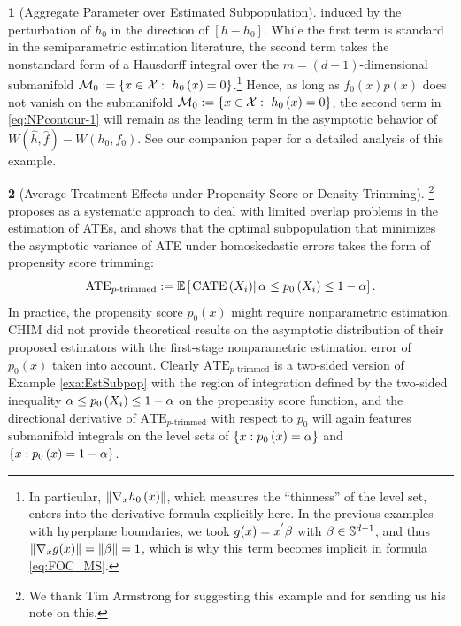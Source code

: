 \documentclass[12pt,american]{article}
\theoremstyle{definition}
\newtheorem{example}{\protect\examplename}
\theoremstyle{plain}
\theoremstyle{definition}
\theoremstyle{plain}
\theoremstyle{plain}
\theoremstyle{plain}
\theoremstyle{plain}
\theoremstyle{plain}
\newcommand{\E}{\mathbb{E}}
\newcommand{\norm}[1]{\left\| #1 \right\|}
\providecommand{\examplename}{Example}
\providecommand{\examplename}{Example}
\begin{document}
\begin{example}[Aggregate Parameter over Estimated Subpopulation]
  induced by the perturbation of $h_{0}$ in the direction of $[h-h_{0}]$.
  While the first term is standard in the semiparametric estimation literature,
  the second term takes the nonstandard form of a Hausdorff integral over
  the $m=\left(d-1\right)$-dimensional submanifold ${\cal M}_0:=\left\{x\in \mathcal{X}:~ h_{0}\left(x\right)=0\right\}$.\footnote{In particular, $\norm{\Dif_{x}h_{0}\left(x\right)}$, which measures
    the ``thinness'' of the level set, enters into the derivative formula
    explicitly here. In the previous examples with hyperplane boundaries,
    we took $g(x)=x^{'}\beta$ with $\beta\in\mathbb{S}^{d-1}$, and
    thus $\norm{\Dif_{x}g(x)}=\norm{\b}=1$, which is
  why this term becomes implicit in formula \eqref{eq:FOC_MS}.} Hence,
  as long as $f_0(x)p(x)$ does not vanish on the submanifold ${\cal M}_0:=\left\{x\in \mathcal{X}:~ h_{0}\left(x\right)=0\right\}$, the second term in \eqref{eq:NPcontour-1}
  will remain as the leading term in the asymptotic
  behavior of $W\left(\hat{h},\hat{f}\right)-W(h_0,f_0)$.
  See our companion paper \citep*{CCG2025} for a detailed analysis of this example.
\end{example}
%

%

\begin{example}[Average Treatment Effects under Propensity Score or Density Trimming]\label{exa:TrimATE}\footnote{We thank Tim Armstrong for suggesting this example and for sending us his note on this.}
  \citet*[CHIM thereafter]{crump2009dealing}
  proposes as a systematic approach to deal with limited overlap problems
  in the estimation of ATEs, and shows that the optimal subpopulation
  that minimizes the asymptotic variance of ATE under homoskedastic errors
  takes the form of propensity score trimming:
  \[
    \text{ATE}_{p\text{-trimmed}}:=\E\left[\rest{\text{CATE}\left(X_{i}\right)}\a\leq p_{0}\left(X_{i}\right)\leq1-\a\right].
  \]
  In practice, the propensity score $p_{0}\left(x\right)$ might require
  nonparametric estimation. CHIM did not provide theoretical results
  on the asymptotic distribution of their proposed estimators with the
  first-stage nonparametric estimation error of $p_{0}\left(x\right)$
  taken into account. Clearly $\text{ATE}_{p\text{-trimmed}}$ is a
  two-sided version of Example \ref{exa:EstSubpop} with the region
  of integration defined by the two-sided inequality $\alpha\leq p_{0}\left(X_{i}\right)\leq1-\alpha$
  on the propensity score function, and the directional derivative of
  $\text{ATE}_{p\text{-trimmed}}$ with respect to $p_{0}$ will again
  features submanifold integrals on the level sets of $\left\{ x:p_{0}\left(x\right)=\alpha\right\} $
  and $\left\{ x:p_{0}\left(x\right)=1-\alpha\right\} $.
\end{example}
\end{document}
